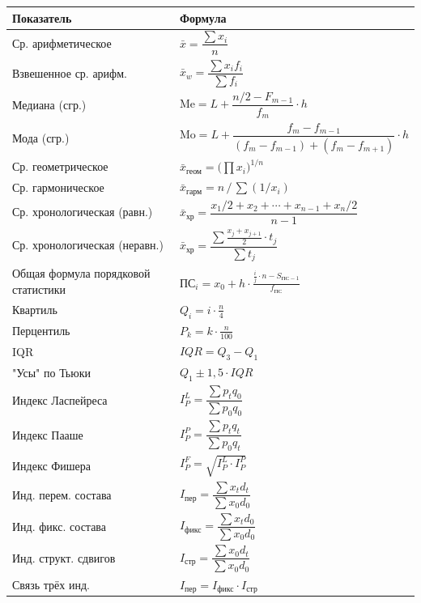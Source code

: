 \documentclass[a4paper]{article}
\begin{document}
\begin{center}
	\renewcommand{\arraystretch}{1.8}
	\begin{tabular}{p{4.5cm} p{8cm}}
		\toprule
		\textbf{Показатель} & \textbf{Формула} \\
		\midrule
		Ср. арифметическое & $\bar{x} = \dfrac{\sum x_i}{n}$ \\
		Взвешенное ср. арифм. & $\bar{x}_w = \dfrac{\sum x_i f_i}{\sum f_i}$ \\
		Медиана (сгр.) &
		$\text{Me} = L + \dfrac{n/2 - F_{m-1}}{f_m}\cdot h$ \\
		Мода (сгр.) &
		$\text{Mo} = L + \dfrac{f_m - f_{m-1}}{(f_m-f_{m-1})+(f_m-f_{m+1})}\cdot h$ \\
		Ср. геометрическое & $\bar{x}_{\text{геом}}  = \bigl(\prod x_i\bigr)^{1/n}$ \\
		Ср. гармоническое & $\bar{x}_{\text{гарм}}  = n\,/\,\sum(1/x_i)$ \\
		Ср. хронологическая (равн.) &
		$\bar{x}_{\text{хр}} = \dfrac{x_1/2 + x_2 + \cdots + x_{n-1} + x_n/2}{n-1}$ \\
		Ср. хронологическая (неравн.) &
		$\bar{x}_{\text{хр}} = \dfrac{\sum \frac{x_j+x_{j+1}}{2}\cdot t_j}{\sum t_j}$ \\
		Общая формула порядковой статистики & $ \text{ПС}_i = x_0 + h \cdot \frac{\frac{i}{j}  \cdot n - S_{ПС-1}}{f_{ПС}} $ \\
		Квартиль & $Q_i = i\cdot \frac{n}{ 4}$ \\
		Перцентиль & $P_k = k\cdot \frac{n}{100}$ \\
		IQR & $IQR = Q_3 - Q_1$ \\
		"Усы" по Тьюки & $Q_1 \pm 1{,}5\cdot IQR$ \\
		Индекс Ласпейреса & $I_P^L = \dfrac{\sum p_t q_0}{\sum p_0 q_0}$ \\
		Индекс Пааше & $I_P^P = \dfrac{\sum p_t q_t}{\sum p_0 q_t}$ \\
		Индекс Фишера & $I_P^F = \sqrt{I_P^L \cdot I_P^P}$ \\
		Инд. перем. состава & $I_{\text{пер}} = \dfrac{\sum x_t d_t}{\sum x_0 d_0}$ \\
		Инд. фикс. состава & $I_{\text{фикс}} = \dfrac{\sum x_t d_0}{\sum x_0 d_0}$ \\
		Инд. структ. сдвигов & $I_{\text{стр}} = \dfrac{\sum x_0 d_t}{\sum x_0 d_0}$ \\
		Связь трёх инд. & $I_{\text{пер}} = I_{\text{фикс}} \cdot I_{\text{стр}}$ \\
		\bottomrule
	\end{tabular}
\end{center}
\end{document}
